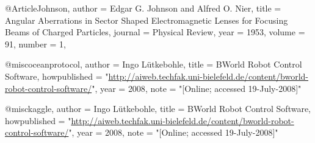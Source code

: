 @Article{Johnson,
author = {Edgar G. Johnson and Alfred O. Nier},
title = {Angular Aberrations in Sector Shaped Electromagnetic Lenses for Focusing Beams of 
Charged Particles},
journal = {Physical Review},
year = {1953},
volume = {91},
number = {1},
}

@misc{oceanprotocol,
  author = {Ingo Lütkebohle},
  title = {{BWorld Robot Control Software}},
  howpublished = "\url{http://aiweb.techfak.uni-bielefeld.de/content/bworld-robot-control-software/}",
  year = {2008}, 
  note = "[Online; accessed 19-July-2008]"
}

@misc{kaggle,
  author = {Ingo Lütkebohle},
  title = {{BWorld Robot Control Software}},
  howpublished = "\url{http://aiweb.techfak.uni-bielefeld.de/content/bworld-robot-control-software/}",
  year = {2008}, 
  note = "[Online; accessed 19-July-2008]"
}